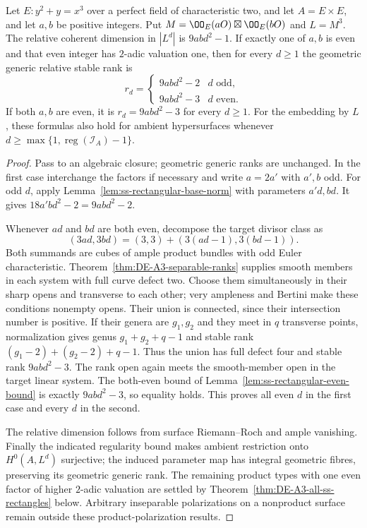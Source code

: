 \begin{theorem}
\label{thm:ss-rectangular-all-degrees}
Let $E:y^2+y=x^3$ over a perfect field of characteristic two, and
let $A=E\times E$, and let $a,b$ be positive integers.  Put
$M=\OO_E(aO)\boxtimes\OO_E(bO)$ and $L=M^3$.
The relative coherent dimension in $|L^d|$ is $9abd^2-1$.
If exactly one of $a,b$ is even and that even integer has
$2$-adic valuation one, then for every $d\ge1$ the geometric generic
relative stable rank is
\[
 r_d=\begin{cases}9abd^2-2&d\text{ odd},\\
                  9abd^2-3&d\text{ even}.
      \end{cases}
\]
If both $a,b$ are even, it is $r_d=9abd^2-3$ for every $d\ge1$.
For the embedding by $L$, these formulas also hold for ambient
hypersurfaces whenever
$d\ge\max\{1,\operatorname{reg}(\mathcal I_A)-1\}$.
\end{theorem}
\begin{proof}
Pass to an algebraic closure; geometric generic ranks are unchanged.
In the first case interchange the factors if necessary and write
$a=2a'$ with $a',b$ odd.  For odd $d$, apply
Lemma~\ref{lem:ss-rectangular-base-norm} with parameters $a'd,bd$.
It gives $18a'bd^2-2=9abd^2-2$.

Whenever $ad$ and $bd$ are both even, decompose the target divisor
class as
\[
 (3ad,3bd)=(3,3)+(3(ad-1),3(bd-1)).
\]
Both summands are cubes of ample product bundles with odd Euler
characteristic.  Theorem~\ref{thm:DE-A3-separable-ranks} supplies
smooth members in each system with full curve defect two.
Choose them simultaneously in their sharp opens and transverse
to each other; very ampleness and Bertini make these conditions
nonempty opens.  Their union is connected, since their intersection
number is positive.  If their genera are $g_1,g_2$ and they meet in
$q$ transverse points, normalization gives genus $g_1+g_2+q-1$
and stable rank $(g_1-2)+(g_2-2)+q-1$.  Thus the union has full
defect four and stable rank $9abd^2-3$.
The rank open again meets the smooth-member open in the target
linear system.  The both-even bound of
Lemma~\ref{lem:ss-rectangular-even-bound} is exactly $9abd^2-3$,
so equality holds.  This proves all even $d$ in the first case and
every $d$ in the second.

The relative dimension follows from surface Riemann--Roch and ample
vanishing.  Finally the indicated regularity bound makes ambient
restriction onto $H^0(A,L^d)$ surjective; the induced parameter map
has integral geometric fibres, preserving its geometric generic
rank.  The remaining product types with one even factor of higher
$2$-adic valuation are settled by
Theorem~\ref{thm:DE-A3-all-ss-rectangles} below. Arbitrary
inseparable polarizations on a nonproduct surface remain outside
these product-polarization results.
\end{proof}

